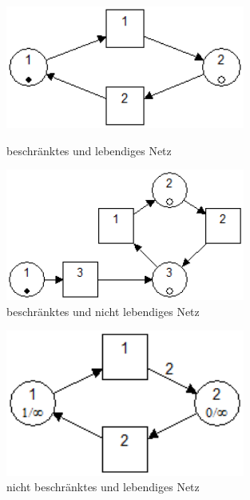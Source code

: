 \documentclass[10pt]{scrartcl}
\begin{document}
\begin{enumerate}
\begin{figure}
\begin{minipage}[hbt]{7cm}
	\centering
	\includegraphics[width=0.7\textwidth]{Bilder/2_Beschraenkt_und_Lebendig.png}
	\caption{beschränktes und lebendiges Netz}
	\label{fig:BL}
\end{minipage}
\hfill
\begin{minipage}[hbt]{7cm}
	\centering
	\includegraphics[width=0.7\textwidth]{Bilder/2_Beschraenkt_nicht_Lebendig.png}
	\caption{beschränktes und nicht lebendiges Netz}
	\label{fig:BnL}
\end{minipage}
\end{figure}
\begin{figure}
\begin{minipage}[hbt]{7cm}
	\centering
	\includegraphics[width=0.7\textwidth]{Bilder/2_Nicht_Beschraenkt_und_Lebendig.png}
	\caption{nicht beschränktes und lebendiges Netz}
	\label{fig:nBL}
\end{minipage}
\hfill
\begin{minipage}[hbt]{7cm}

\end{minipage}
\end{figure}
\end{enumerate}
\end{document}
